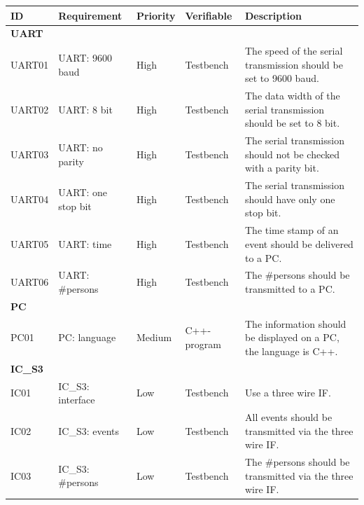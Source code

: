 \documentclass[12pt,a4 paper] {report}
\begin{document}
\begin{center}
	\begin{tabular}{|p{1.5cm}|p{3.5cm}|p{2cm}|p{2cm}|p{6cm}|}
		\hline
		\textbf{ID} & \textbf{Requirement} & \textbf{Priority} & \textbf{Verifiable} & \textbf{Description}\\
		\hline
		\multicolumn{5}{|l|}{\textbf{UART}} \\
		\hline
		UART01 & UART: 9600 baud & High &  Testbench & The speed of the serial transmission should be set to 9600 baud. \\
		\hline
		UART02 & UART: 8 bit & High & Testbench & The data width of the serial transmission should be set to 8 bit. \\
		\hline
		UART03 & UART: no parity & High & Testbench & The serial transmission should not be checked with a parity bit. \\
		\hline
		UART04 & UART: one stop bit & High  & Testbench & The serial transmission should have only one stop bit. \\
		\hline
		UART05 & UART: time & High & Testbench  & The time stamp of an event should be delivered to a PC. \\
		\hline
		UART06 & UART: \#persons & High &  Testbench &  The \#persons should be transmitted to a PC. \\
		\hline
		\multicolumn{5}{|l|}{\textbf{PC}} \\
		\hline	
		PC01 & PC: language & Medium & C++-program &  The information should be displayed on a PC, the language is C++. \\
		\hline
		\multicolumn{5}{|l|}{\textbf{IC\_S3}} \\
		\hline
		IC01 & IC\_S3: interface & Low & Testbench & Use a three wire IF. \\
		\hline
		IC02 & IC\_S3: events & Low & Testbench & All events should be transmitted via the three wire IF. \\
		\hline
		IC03 & IC\_S3: \#persons & Low  & Testbench & The \#persons should be transmitted via the three wire IF. \\
		\hline
	\end{tabular}
\end{center}

\newpage
\end{document}
